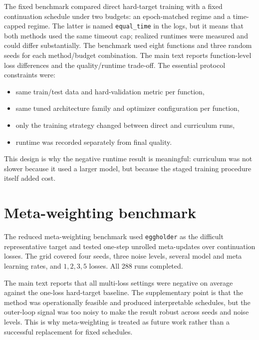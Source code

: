 The fixed benchmark compared direct hard-target training with a fixed
continuation schedule under two budgets: an epoch-matched regime and a
time-capped regime. The latter is named \texttt{equal\_time} in the logs, but it
means that both methods used the same timeout cap; realized runtimes were
measured and could differ substantially. The benchmark used eight functions and
three random seeds for each method/budget combination. The main text reports
function-level loss differences and the quality/runtime trade-off. The essential
protocol constraints were:

\begin{itemize}
    \item same train/test data and hard-validation metric per function,
    \item same tuned architecture family and optimizer configuration per
          function,
    \item only the training strategy changed between direct and curriculum runs,
    \item runtime was recorded separately from final quality.
\end{itemize}

This design is why the negative runtime result is meaningful: curriculum was not
slower because it used a larger model, but because the staged training procedure
itself added cost.

\section{Meta-weighting benchmark}
\label{app:meta-weighting-eggholder-u1}

The reduced meta-weighting benchmark used \texttt{eggholder} as the difficult
representative target and tested one-step unrolled meta-updates over
continuation losses. The grid covered four seeds, three noise levels, several
model and meta learning rates, and \(1,2,3,5\) losses. All 288 runs completed.

The main text reports that all multi-loss settings were negative on average
against the one-loss hard-target baseline. The supplementary point is that the
method was operationally feasible and produced interpretable schedules, but the
outer-loop signal was too noisy to make the result robust across seeds and noise
levels. This is why meta-weighting is treated as future work rather than a
successful replacement for fixed schedules.
